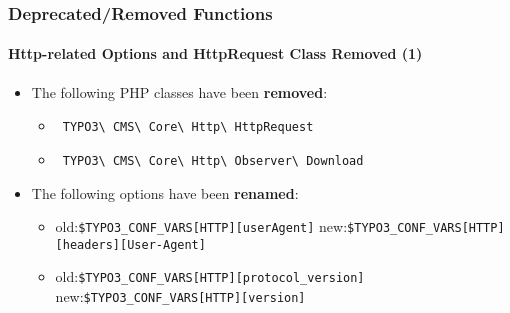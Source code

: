 
\begin{frame}[fragile]
	\frametitle{Deprecated/Removed Functions}
	\framesubtitle{Http-related Options and HttpRequest Class Removed (1)}

	\begin{itemize}

		\item The following PHP classes have been \textbf{removed}:

			\begin{itemize}
				\item \small\texttt{
					TYPO3\textbackslash
					CMS\textbackslash
					Core\textbackslash
					Http\textbackslash
					HttpRequest}\normalsize
				\item \small\texttt{
					TYPO3\textbackslash
					CMS\textbackslash
					Core\textbackslash
					Http\textbackslash
					Observer\textbackslash
					Download}\normalsize
			\end{itemize}

		\item The following options have been \textbf{renamed}:

			\begin{itemize}

				\item
					\small
						old:\tabto{1cm}\texttt{\$TYPO3\_CONF\_VARS[HTTP][userAgent]}\newline
						new:\tabto{1cm}\texttt{\$TYPO3\_CONF\_VARS[HTTP][headers][User-Agent]}

				\item
					\small
						old:\tabto{1cm}\texttt{\$TYPO3\_CONF\_VARS[HTTP][protocol\_version]}\newline
						new:\tabto{1cm}\texttt{\$TYPO3\_CONF\_VARS[HTTP][version]}

			\end{itemize}

	\end{itemize}

\end{frame}


